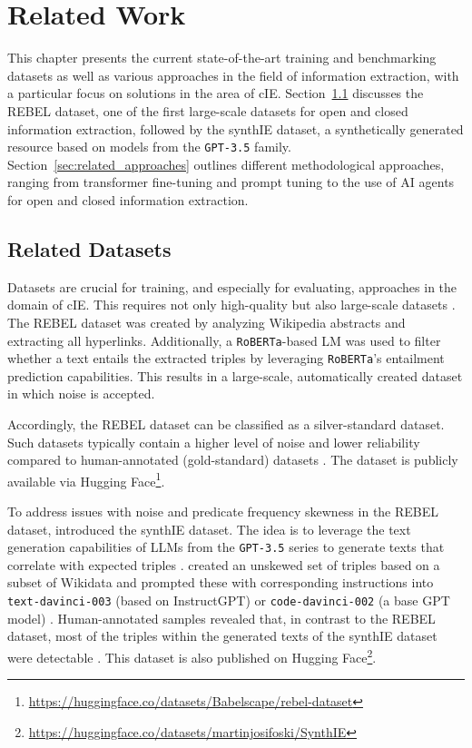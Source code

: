 \documentclass[a4paper,oneside,bibliography=totoc]{scrbook}
\begin{document}
\chapter{Related Work}
\label{ch:related_work_chapter}

This chapter presents the current state-of-the-art training and benchmarking datasets as well as various approaches in the field of information extraction, with a particular focus on solutions in the area of \ac{cIE}. Section~\ref{sec:related_datasets} discusses the REBEL dataset, one of the first large-scale datasets for open and closed information extraction, followed by the synthIE dataset, a synthetically generated resource based on models from the \texttt{GPT-3.5} family. Section~\ref{sec:related_approaches} outlines different methodological approaches, ranging from transformer fine-tuning and prompt tuning to the use of \ac{AI} agents for open and closed information extraction.

\section{Related Datasets}
\label{sec:related_datasets}

Datasets are crucial for training, and especially for evaluating, approaches in the domain of \ac{cIE}. This requires not only high-quality but also large-scale datasets \cite{Josifoski2023}. The REBEL dataset was created by analyzing Wikipedia abstracts and extracting all hyperlinks. Additionally, a \texttt{RoBERTa}-based \ac{LM} was used to filter whether a text entails the extracted triples by leveraging \texttt{RoBERTa}’s entailment prediction capabilities. This results in a large-scale, automatically created dataset in which noise is accepted.

Accordingly, the REBEL dataset can be classified as a silver-standard dataset. Such datasets typically contain a higher level of noise and lower reliability compared to human-annotated (gold-standard) datasets \cite{HuguetCabot2021}. The dataset is publicly available via Hugging Face\footnote{\url{https://huggingface.co/datasets/Babelscape/rebel-dataset}}.

To address issues with noise and predicate frequency skewness in the REBEL dataset, \citet{Josifoski2023} introduced the synthIE dataset. The idea is to leverage the text generation capabilities of \acp{LLM} from the \texttt{GPT-3.5} series to generate texts that correlate with expected triples \cite{Josifoski2023}. \citet{Josifoski2023} created an unskewed set of triples based on a subset of Wikidata and prompted these with corresponding instructions into \texttt{text-davinci-003} (based on InstructGPT) or \texttt{code-davinci-002} (a base GPT model) \cite{Josifoski2023,OpenAI2025a}. Human-annotated samples revealed that, in contrast to the REBEL dataset, most of the triples within the generated texts of the synthIE dataset were detectable \cite{Josifoski2023}. This dataset is also published on Hugging Face\footnote{\url{https://huggingface.co/datasets/martinjosifoski/SynthIE}}.
\end{document}
